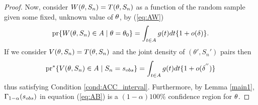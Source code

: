 \begin{proof}
Now, consider $W( \btheta,S_n) = T( \theta, S_n)$ as a function of the random sample given some fixed, unknown value of $\btheta$, by (\ref{eq:AW})
	\[ \text{pr}\{W(\btheta, S_{n}) \in A \mid \btheta=  \btheta_0\} =  \int_{t \in A} g(t) d t   \{1 + o(\delta)\} .\]
If we consider $V( \btheta,S_n) = T( \theta, S_n)$ and the joint density of $(\theta', S_n')$ pairs %
then
	\[ \text{pr}^*\{V(\btheta, S_n) \in A \mid  S_n= s_{\rm obs} \} = \int_{t \in A} g(t)  dt \{1 + o(\delta^{''})\}  \]
thus satisfying Condition \ref{cond:ACC_interval}. Furthermore, by Lemma \ref{main1}, $\Gamma_{1-\alpha}(s_{\rm obs})$ in equation (\ref{eq:AB}) is a $(1-\alpha)100\%$ confidence region for $\btheta$. 
\end{proof}
	
	
